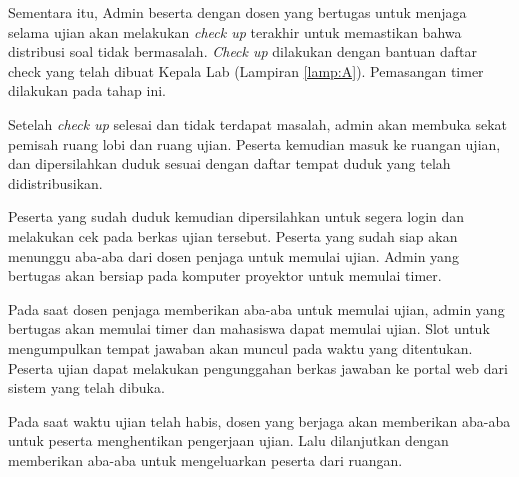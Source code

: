         Sementara itu, Admin beserta dengan dosen yang bertugas untuk menjaga
        selama ujian akan melakukan \textit{check up} terakhir untuk memastikan
        bahwa distribusi soal tidak bermasalah. \textit{Check up} dilakukan
        dengan bantuan daftar check yang telah dibuat Kepala Lab (Lampiran
        \ref{lamp:A}). Pemasangan timer dilakukan pada tahap ini.
        
        Setelah \textit{check up} selesai dan tidak terdapat masalah, admin akan
        membuka sekat pemisah ruang lobi dan ruang ujian. Peserta kemudian masuk
        ke ruangan ujian, dan dipersilahkan duduk sesuai dengan daftar tempat
        duduk yang telah didistribusikan.
        
        Peserta yang sudah duduk kemudian dipersilahkan untuk segera login dan
        melakukan cek pada berkas ujian tersebut. Peserta yang sudah siap akan
        menunggu aba-aba dari dosen penjaga untuk memulai ujian. Admin yang
        bertugas akan bersiap pada komputer proyektor untuk memulai timer.
        
        Pada saat dosen penjaga memberikan aba-aba untuk memulai ujian, admin
        yang bertugas akan memulai timer dan mahasiswa dapat memulai ujian. Slot
        untuk mengumpulkan tempat jawaban akan muncul pada waktu yang
        ditentukan. Peserta ujian dapat melakukan pengunggahan berkas jawaban ke
        portal web dari sistem yang telah dibuka.
        
        Pada saat waktu ujian telah habis, dosen yang berjaga akan memberikan
        aba-aba untuk peserta menghentikan pengerjaan ujian. Lalu dilanjutkan
        dengan memberikan aba-aba untuk mengeluarkan peserta dari ruangan.
    

